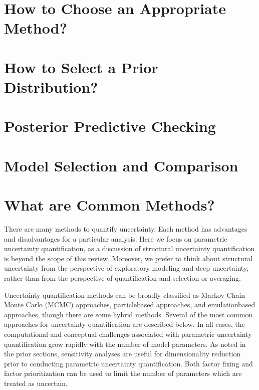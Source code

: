 \documentclass[letterpaper,10pt,english]{sphinxmanual}
\begin{document}
\section{How to Choose an Appropriate Method?}
\label{\detokenize{6_uncertainty_quantification_a_tool_for_capturing_risks_and_extremes:how-to-choose-an-appropriate-method}}

\section{How to Select a Prior Distribution?}
\label{\detokenize{6_uncertainty_quantification_a_tool_for_capturing_risks_and_extremes:how-to-select-a-prior-distribution}}

\section{Posterior Predictive Checking}
\label{\detokenize{6_uncertainty_quantification_a_tool_for_capturing_risks_and_extremes:posterior-predictive-checking}}

\section{Model Selection and Comparison}
\label{\detokenize{6_uncertainty_quantification_a_tool_for_capturing_risks_and_extremes:model-selection-and-comparison}}

\section{What are Common Methods?}
\label{\detokenize{6_uncertainty_quantification_a_tool_for_capturing_risks_and_extremes:what-are-common-methods}}
\sphinxAtStartPar
There are many  methods to quantify  uncertainty. Each  method has advantages and disadvantages for a particular analysis. Here we focus on parametric uncertainty quantification, as a discussion of structural uncertainty quantification is beyond  the scope of this review. Moreover, we prefer to think about structural uncertainty from the perspective of exploratory modeling and deep uncertainty, rather than from the perspective of quantification and selection or averaging.

\sphinxAtStartPar
Uncertainty quantification methods can be broadly classified as Markov Chain Monte Carlo (MCMC) approaches, particle\sphinxhyphen{}based approaches, and emulation\sphinxhyphen{}based approaches, though there are some hybrid methods. Several of the most common approaches for uncertainty quantification are described below. In all cases, the computational and conceptual challenges associated with parametric uncertainty quantification grow rapidly with the number of model parameters. As noted in the prior sections, sensitivity analyses are useful for dimensionality reduction prior to conducting parametric uncertainty quantification. Both factor fixing and factor prioritization can be used to limit the number of parameters which are treated as uncertain.
\end{document}
